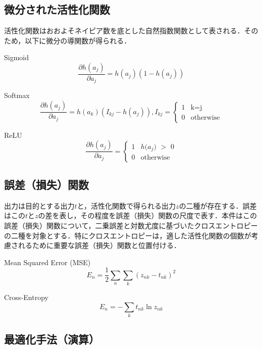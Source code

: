 \documentclass{jsarticle}
\begin{document}
\subsection{微分された活性化関数}
\label{微分された活性化関数}

活性化関数はおおよそネイピア数を底とした自然指数関数として表される．そのため，以下に微分の導関数が得られる．

\begin{itembox}[l]{Sigmoid}
\[
\frac{\partial h(a_j)}{\partial a_j} = h(a_j) (1-h(a_j))
\]
\end{itembox}

\begin{itembox}[l]{Softmax}
\[
\frac{\partial h(a_j)}{\partial a_j} = h(a_k)(I_{kj} - h(a_j)), 
I_{kj}=\begin{cases}
1 & \text{k=j} \\
0 & \text{otherwise}
\end{cases}
\]
\end{itembox}

\begin{itembox}[l]{ReLU}
\[
\frac{\partial h(a_j)}{\partial a_j} =
\begin{cases}
1 & \text{$h(a_{j}$) $>$ 0} \\
0 & \text{otherwise}
\end{cases}
\]
\end{itembox}

\subsection{誤差（損失）関数}
\label{誤差（損失）関数}

出力は目的とする出力$t$と，活性化関数で得られる出力$z$の二種が存在する．誤差はこの$t$と$z$の差を表し，その程度を誤差（損失）関数の尺度で表す．本件はこの誤差（損失）関数について，二乗誤差と対数尤度に基づいたクロスエントロピーの二種を対象とする．特にクロスエントロピーは，適した活性化関数の個数が考慮されるために重要な誤差（損失）関数と位置付ける．

\begin{itembox}[l]{Mean Squared Error (MSE)}
\[
E_n=\frac{1}{2} \sum_n \sum_k (z_{nk} - t_{nk})^2
\]
\end{itembox}

\begin{itembox}[l]{Cross-Entropy}
\[
E_n=- \sum_{k} t_{nk} \ln z_{nk}
\]
\end{itembox}

\subsection{最適化手法（演算）}
\label{最適化手法（演算）}
\end{document}
